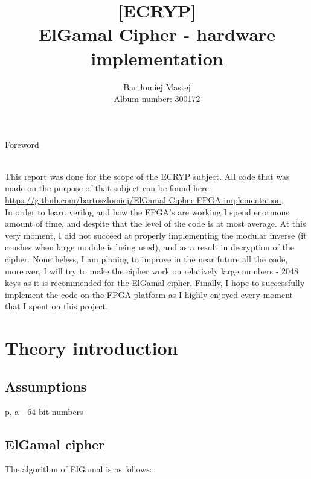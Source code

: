 \documentclass{report}
\title{[ECRYP]\\
   ElGamal Cipher - hardware implementation}
\author{Bartłomiej Mastej\\ Album number: 300172}
\begin{document}
\maketitle

\begin{LARGE}Foreword\end{LARGE}\\
This report was done for the scope of the ECRYP subject. All code that was made on the purpose of that subject can be found here \\ \url{https://github.com/bartoszlomiej/ElGamal-Cipher-FPGA-implementation}.\\ In order to learn verilog and how the FPGA's are working I spend enormous amount of time, and despite that the level of the code is at most average. At this very moment, I did not succeed at properly implementing the modular inverse (it crushes when large module is being used), and as a result in decryption of the cipher. Nonetheless, I am planing to improve in the near future all the code, moreover, I will try to make the cipher work on relatively large numbers - 2048 keys as it is recommended for the ElGamal cipher. Finally, I hope to successfully implement the code on the FPGA platform as I highly enjoyed every moment that I spent on this project.
\chapter{Theory introduction}
\section{Assumptions}
p, a - 64 bit numbers

\section{ElGamal cipher}
The algorithm of ElGamal is as follows:\\ \\
\end{document}
